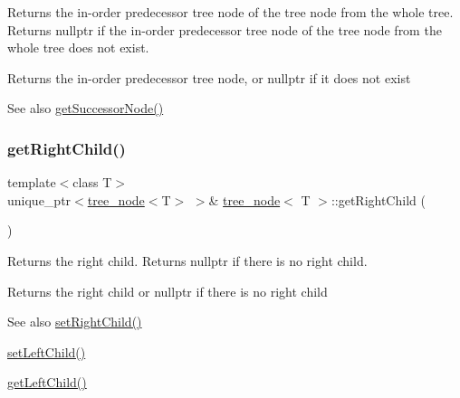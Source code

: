 Returns the in-\/order predecessor tree node of the tree node from the whole tree. Returns nullptr if the in-\/order predecessor tree node of the tree node from the whole tree does not exist. \begin{DoxyReturn}{Returns}
the in-\/order predecessor tree node, or nullptr if it does not exist 
\end{DoxyReturn}
\begin{DoxySeeAlso}{See also}
\hyperlink{classtree__node_a666b33dc3b2f3e2d2e4815cc4ec8b131}{get\+Successor\+Node()} 
\end{DoxySeeAlso}
\mbox{\label{classtree__node_a5e584d47f2c11941fe0406836fe50159}} 
\subsubsection{\texorpdfstring{get\+Right\+Child()}{getRightChild()}}
{\footnotesize\ttfamily template$<$class T$>$ \\
unique\+\_\+ptr$<$\hyperlink{classtree__node}{tree\+\_\+node}$<$T$>$ $>$\& \hyperlink{classtree__node}{tree\+\_\+node}$<$ T $>$\+::get\+Right\+Child (\begin{DoxyParamCaption}{ }\end{DoxyParamCaption})\hspace{0.3cm}{\ttfamily [inline]}}

Returns the right child. Returns nullptr if there is no right child. \begin{DoxyReturn}{Returns}
the right child or nullptr if there is no right child 
\end{DoxyReturn}
\begin{DoxySeeAlso}{See also}
\hyperlink{classtree__node_afea4c6595dafba65b5c4e59ca3da30f3}{set\+Right\+Child()} 

\hyperlink{classtree__node_a3db979969a0fe8505ba65c7afabb5463}{set\+Left\+Child()} 

\hyperlink{classtree__node_ae161b70a3780e0cb3ecd4b57acc9e2d1}{get\+Left\+Child()} 
\end{DoxySeeAlso}
\mbox{\label{classtree__node_a666b33dc3b2f3e2d2e4815cc4ec8b131}} 
